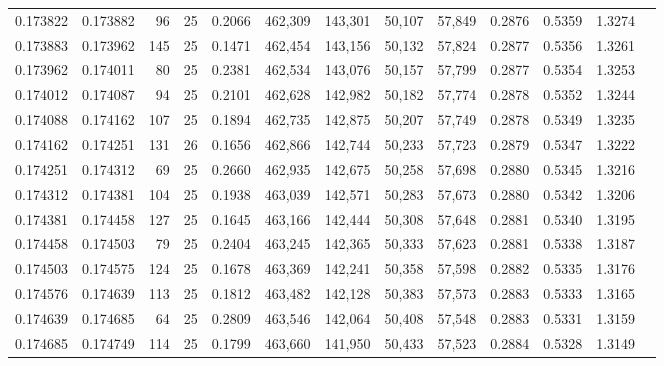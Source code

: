 \begin{tabular}{rrrrrrrrrrrrr}
0.173822 & 0.173882 &    96 &  25 &                                     0.2066 & 462,309 & 143,301 &  50,107 &  57,849 & 0.2876 & 0.5359 & 1.3274 \\
0.173883 & 0.173962 &   145 &  25 &                                     0.1471 & 462,454 & 143,156 &  50,132 &  57,824 & 0.2877 & 0.5356 & 1.3261 \\
0.173962 & 0.174011 &    80 &  25 &                                     0.2381 & 462,534 & 143,076 &  50,157 &  57,799 & 0.2877 & 0.5354 & 1.3253 \\
0.174012 & 0.174087 &    94 &  25 &                                     0.2101 & 462,628 & 142,982 &  50,182 &  57,774 & 0.2878 & 0.5352 & 1.3244 \\
0.174088 & 0.174162 &   107 &  25 &                                     0.1894 & 462,735 & 142,875 &  50,207 &  57,749 & 0.2878 & 0.5349 & 1.3235 \\
0.174162 & 0.174251 &   131 &  26 &                                     0.1656 & 462,866 & 142,744 &  50,233 &  57,723 & 0.2879 & 0.5347 & 1.3222 \\
0.174251 & 0.174312 &    69 &  25 &                                     0.2660 & 462,935 & 142,675 &  50,258 &  57,698 & 0.2880 & 0.5345 & 1.3216 \\
0.174312 & 0.174381 &   104 &  25 &                                     0.1938 & 463,039 & 142,571 &  50,283 &  57,673 & 0.2880 & 0.5342 & 1.3206 \\
0.174381 & 0.174458 &   127 &  25 &                                     0.1645 & 463,166 & 142,444 &  50,308 &  57,648 & 0.2881 & 0.5340 & 1.3195 \\
0.174458 & 0.174503 &    79 &  25 &                                     0.2404 & 463,245 & 142,365 &  50,333 &  57,623 & 0.2881 & 0.5338 & 1.3187 \\
0.174503 & 0.174575 &   124 &  25 &                                     0.1678 & 463,369 & 142,241 &  50,358 &  57,598 & 0.2882 & 0.5335 & 1.3176 \\
0.174576 & 0.174639 &   113 &  25 &                                     0.1812 & 463,482 & 142,128 &  50,383 &  57,573 & 0.2883 & 0.5333 & 1.3165 \\
0.174639 & 0.174685 &    64 &  25 &                                     0.2809 & 463,546 & 142,064 &  50,408 &  57,548 & 0.2883 & 0.5331 & 1.3159 \\
0.174685 & 0.174749 &   114 &  25 &                                     0.1799 & 463,660 & 141,950 &  50,433 &  57,523 & 0.2884 & 0.5328 & 1.3149 \\

\end{tabular}
